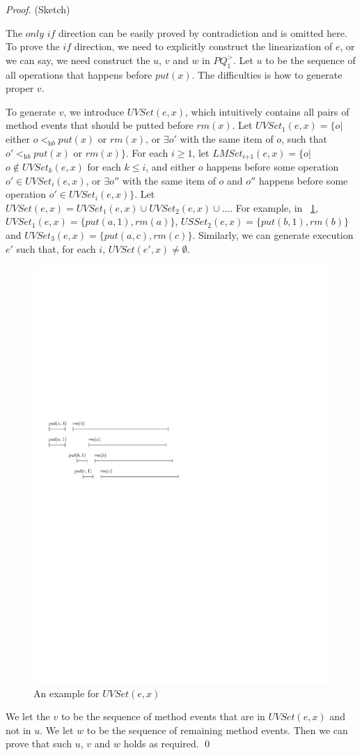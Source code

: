 \begin {proof} (Sketch)

The $\textit{only if}$ direction can be easily proved by contradiction and is omitted here. To prove the $\textit{if}$ direction, we need to explicitly construct the linearization of $e$, or we can say, we need construct the $u$, $v$ and $w$ in $\textit{PQ}_1^{>}$. Let $u$ to be the sequence of all operations that happens before $\textit{put}(x)$. The difficulties is how to generate proper $v$.

To generate $v$, we introduce $\textit{UVSet}(e,x)$, which intuitively contains all pairs of method events that should be putted before $\textit{rm}(x)$. Let $\textit{UVSet}_1(e,x)= \{ o \vert$ either $o <_{\textit{hb}} \textit{put}(x)$ or $\textit{rm}(x)$, or $\exists o'$ with the same item of $o$, such that $o' <_{\textit{hb}} \textit{put}(x)$ or $\textit{rm}(x)\}$. For each $i \geq 1$, let $\textit{LMSet}_{\textit{i+1}}(e,x) = \{ o \vert$ $o \notin \textit{UVSet}_k(e,x)$ for each $k \leq i$, and either $o$ happens before some operation $o' \in \textit{UVSet}_i(e,x)$, or $\exists o''$ with the same item of $o$ and $o''$ happens before some operation $o' \in \textit{UVSet}_i(e,x)\}$. Let $\textit{UVSet}(e,x) = \textit{UVSet}_1(e,x) \cup \textit{UVSet}_2(e,x) \cup \ldots$. For example, in \figurename~\ref{fig:his nobound of LMSet}, $\textit{UVSet}_1(e,x) = \{ \textit{put}(a,1),\textit{rm}(a) \}$, $\textit{USSet}_2(e,x) = \{ \textit{put}(b,1),\textit{rm}(b) \}$ and $\textit{UVSet}_3(e,x) = \{ \textit{put}(a,c),\textit{rm}(c) \}$. Similarly, we can generate execution $e'$ such that, for each $i$, $\textit{UVSet}(e',x) \neq \emptyset$.


\begin{figure}[htbp]
  \centering
  \includegraphics[width=0.5 \textwidth]{figures/PIC_HIS_NOBOUNDOF_LMSET.pdf}
  \caption{An example for $\textit{UVSet}(e,x)$}
  \label{fig:his nobound of LMSet}
\end{figure}

We let the $v$ to be the sequence of method events that are in $\textit{UVSet}(e,x)$ and not in $u$. We let $w$ to be the sequence of remaining method events. Then we can prove that such $u$, $v$ and $w$ holds as required. \qed
\end {proof}

